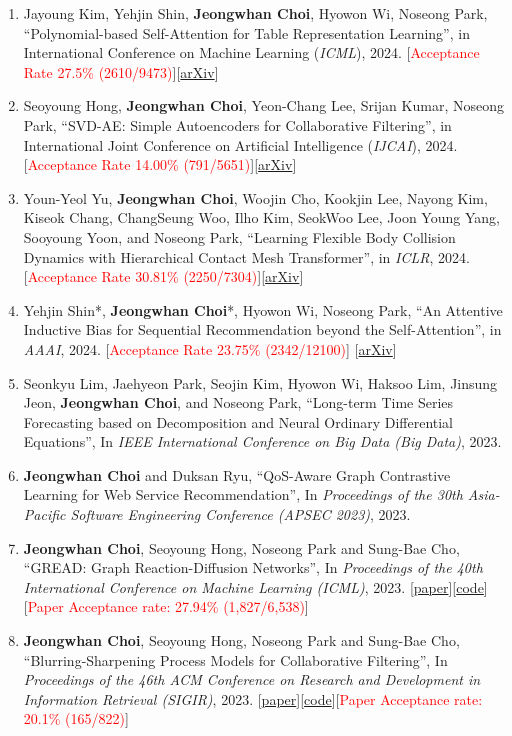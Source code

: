 \documentclass[10pt]{article}
\newenvironment{changemargin}[2]{
  \begin{list}{}{
    \setlength{\topsep}{0pt}
    \setlength{\leftmargin}{#1}
    \setlength{\rightmargin}{#2}
    \setlength{\listparindent}{\parindent}
    \setlength{\itemindent}{\parindent}
    \setlength{\parsep}{\parskip}
  }
  \item[]}{\end{list}
}
\newcommand{\RED}[1]{\textcolor{red}{#1}}
\newenvironment{body} {
	\vspace*{-16pt}
	\begin{changemargin}{-0.25in}{-0.5in}
  }
	{\end{changemargin}
}
\begin{document}
\begin{body}
\begin{enumerate}
    \item Jayoung Kim, Yehjin Shin, \textbf{Jeongwhan Choi}, Hyowon Wi, Noseong Park, ``Polynomial-based Self-Attention for Table Representation Learning'',  in International Conference on Machine Learning (\textit{ICML}), 2024. [\RED{Acceptance Rate 27.5\% (2610/9473)}][\href{https://arxiv.org/abs/2312.07753}{arXiv}]
    \item Seoyoung Hong, \textbf{Jeongwhan Choi}, Yeon-Chang Lee, Srijan Kumar, Noseong Park, ``SVD-AE: Simple Autoencoders for Collaborative Filtering'', in International Joint Conference on Artificial Intelligence (\textit{IJCAI}), 2024. [\RED{Acceptance Rate 14.00\% (791/5651)}][\href{https://arxiv.org/abs/2405.04746}{arXiv}]
    \item Youn-Yeol Yu, \textbf{Jeongwhan Choi}, Woojin Cho, Kookjin Lee, Nayong Kim, Kiseok Chang, ChangSeung Woo, Ilho Kim, SeokWoo Lee, Joon Young Yang, Sooyoung Yoon, and Noseong Park, ``Learning Flexible Body Collision Dynamics with Hierarchical Contact Mesh Transformer'',  in \textit{ICLR}, 2024. [\RED{Acceptance Rate  30.81\% (2250/7304)}][\href{https://arxiv.org/abs/2312.12467}{arXiv}]
    \item Yehjin Shin*, \textbf{Jeongwhan Choi}*, Hyowon Wi, Noseong Park, ``An Attentive Inductive Bias for Sequential Recommendation beyond the Self-Attention'',  in \textit{AAAI}, 2024. [\RED{Acceptance Rate 23.75\% (2342/12100)}] [\href{https://arxiv.org/abs/2312.10325}{arXiv}]
    \item Seonkyu Lim, Jaehyeon Park, Seojin Kim, Hyowon Wi, Haksoo Lim, Jinsung Jeon, \textbf{Jeongwhan Choi}, and Noseong Park, ``Long-term Time Series Forecasting based on Decomposition and Neural Ordinary Differential Equations'', In \emph{IEEE International Conference on Big Data (Big Data)}, 2023.
    \item \textbf{Jeongwhan Choi} and Duksan Ryu, ``QoS-Aware Graph Contrastive Learning for Web Service Recommendation'', In \emph{Proceedings of the 30th Asia-Pacific Software Engineering Conference (APSEC 2023)}, 2023.
    \item \textbf{Jeongwhan Choi}, Seoyoung Hong, Noseong Park and Sung-Bae Cho, ``GREAD: Graph Reaction-Diffusion Networks'', In \emph{Proceedings of the 40th International Conference on Machine Learning (ICML)}, 2023. [\href{http://proceedings.mlr.press/v202/choi23a}{paper}][\href{https://github.com/jeongwhanchoi/GREAD}{code}][\RED{Paper Acceptance rate: 27.94\% (1,827/6,538)}]
    \item \textbf{Jeongwhan Choi}, Seoyoung Hong, Noseong Park and Sung-Bae Cho, ``Blurring-Sharpening Process Models for Collaborative Filtering'', In \emph{Proceedings of the 46th ACM Conference on Research and Development in Information Retrieval (SIGIR)}, 2023. [\href{https://arxiv.org/abs/2211.09324}{paper}][\href{https://github.com/jeongwhanchoi/bspm}{code}][\RED{Paper Acceptance rate: 20.1\% (165/822)}]

\end{enumerate}
\end{body}
\end{document}
